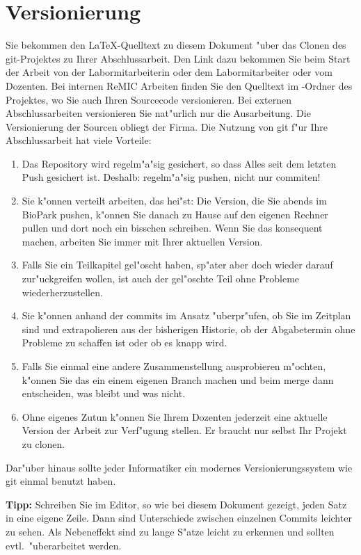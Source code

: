 \documentclass[12pt,a4paper,headinclude,twoside, plainheadsepline, open=right,numbers=noenddot]{scrreprt}
\begin{document}
\section{Versionierung}
\label{versionierung}

Sie bekommen den \LaTeX -Quelltext zu diesem Dokument "uber das Clonen des git-Projektes zu Ihrer Abschlussarbeit.
Den Link dazu bekommen Sie beim Start der Arbeit von der Labormitarbeiterin oder dem Labormitarbeiter oder vom Dozenten.
Bei internen ReMIC Arbeiten finden Sie den Quelltext im -Ordner des Projektes, wo Sie auch Ihren Sourcecode versionieren.
Bei externen Abschlussarbeiten versionieren Sie nat"urlich nur die Ausarbeitung.
Die Versionierung der Sourcen obliegt der Firma.
Die Nutzung von git f"ur Ihre Abschlussarbeit hat viele Vorteile:
\begin{enumerate}
\item Das Repository wird regelm"a"sig gesichert, so dass Alles seit dem letzten Push gesichert ist.
Deshalb: regelm"a"sig pushen, nicht nur commiten!
\item Sie k"onnen verteilt arbeiten, das hei"st:
Die Version, die Sie abends im BioPark pushen, k"onnen Sie danach zu Hause auf den eigenen Rechner pullen und dort noch ein bisschen schreiben.
Wenn Sie das konsequent machen, arbeiten Sie immer mit Ihrer aktuellen Version.
\item Falls Sie ein Teilkapitel gel"oscht haben, sp"ater aber doch wieder darauf zur"uckgreifen wollen, ist auch der gel"oschte Teil ohne Probleme wiederherzustellen.
\item Sie k"onnen anhand der commits im Ansatz "uberpr"ufen, ob Sie im Zeitplan sind und extrapolieren aus der bisherigen Historie, ob der Abgabetermin ohne Probleme zu schaffen ist oder ob es knapp wird.
\item Falls Sie einmal eine andere Zusammenstellung ausprobieren m"ochten, k"onnen Sie das ein einem eigenen Branch machen und beim merge dann entscheiden, was bleibt und was nicht.
\item Ohne eigenes Zutun k"onnen Sie Ihrem Dozenten jederzeit eine aktuelle Version der Arbeit zur Verf"ugung stellen.
Er braucht nur selbst Ihr Projekt zu clonen.
\end{enumerate}
Dar"uber hinaus sollte jeder Informatiker ein modernes Versionierungssystem wie git einmal benutzt haben.

\textbf{Tipp:} Schreiben Sie im Editor, so wie bei diesem Dokument gezeigt, jeden Satz in eine eigene Zeile.
Dann sind Unterschiede zwischen einzelnen Commits leichter zu sehen.
Als Nebeneffekt sind zu lange S"atze leicht zu erkennen und sollten evtl.~"uberarbeitet werden.
\end{document}
